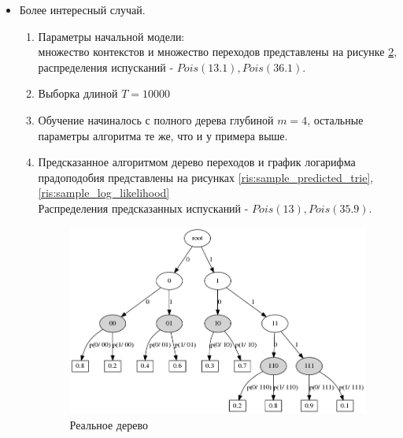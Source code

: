 \documentclass{matmex-diploma-custom}
\begin{document}
{\begin{itemize}
\begin{enumerate}
\begin{figure}[ht]
	\centering
	\caption{Результат работы алгоритма VLHMM на смеси Пуассонов}
	\label{ris:img_mixture_main}
\end{figure}
\end{enumerate}
\item
Более интересный случай. 
\begin{enumerate}
\item Параметры начальной модели: 
\\множество контекстов и множество переходов представлены на рисунке \ref{ris:sample_real_trie}, распределения испусканий - $Pois(13.1), Pois(36.1)$. 
\item Выборка длиной $ T = 10000 $
\item Обучение начиналось с полного дерева глубиной $ m = 4 $, остальные параметры алгоритма те же, что и у примера выше.
\item Предсказанное алгоритмом дерево переходов и график логарифма прадоподобия представлены на рисунках \ref{ris:sample_predicted_trie},\ref{ris:sample_log_likelihood}
\\Распределения предсказанных испусканий - $Pois(13), Pois(35.9)$.
\begin{figure}[ht]\centering
	\parbox[b]{ 0.49 \textwidth}{
	\includegraphics[scale=0.3]{img/sample/real_trie_.png}
	\centering
	\caption{ Реальное дерево }
	\label{ris:sample_real_trie}
	
}
\end{figure}
\end{enumerate}
\end{itemize}}
\end{document}
